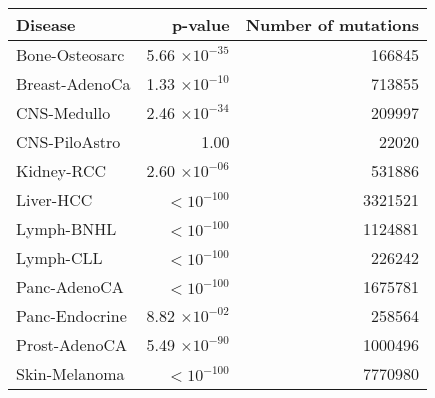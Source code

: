 \vspace{0.2cm}
\begin{table}[h]
\centering
\caption{}
\label{tab:g-test}
\begin{tabular}{lrr}
  \toprule
 \textbf{Disease} & \textbf{p-value} & \textbf{Number of mutations} \\ 
  \hline
 Bone-Osteosarc & 5.66 $\times 10^{-35}$ & 166845 \\ 
 Breast-AdenoCa & 1.33 $\times 10^{-10}$ & 713855 \\ 
 CNS-Medullo & 2.46 $\times 10^{-34}$ & 209997 \\ 
 CNS-PiloAstro & 1.00 & 22020 \\ 
 Kidney-RCC & 2.60 $\times 10^{-06}$ & 531886 \\ 
 Liver-HCC & $<10^{-100}$ & 3321521 \\ 
 Lymph-BNHL & $<10^{-100}$ & 1124881 \\ 
 Lymph-CLL & $<10^{-100}$ & 226242 \\ 
 Panc-AdenoCA & $<10^{-100}$ & 1675781 \\ 
 Panc-Endocrine & 8.82 $\times 10^{-02}$ & 258564 \\ 
 Prost-AdenoCA & 5.49 $\times 10^{-90}$ & 1000496 \\ 
 Skin-Melanoma & $<10^{-100}$ & 7770980 \\ 
   \bottomrule
\end{tabular}
\end{table}